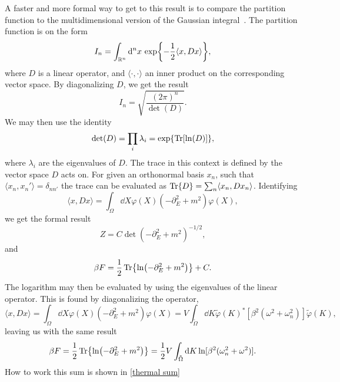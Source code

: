 A faster and more formal way to get to this result is to compare the partition function to the multidimensional version of the Gaussian integral~\cite{Kapusta:finiteTemp, Peskin:IntroQFT}.
The partition function is on the form 
\begin{equation*}
    I_n = \int_{\mathbb{R}^n} \dd^n x\, \exp{- \frac{1}{2} \langle x, D x\rangle },
\end{equation*}
where $D$ is a linear operator, and $\langle \cdot , \cdot \rangle$ an inner product on the corresponding vector space.
By diagonalizing $D$, we get the result
\begin{equation*}
    I_n = \sqrt{\frac{(2 \pi)^n}{\det(D)}}.
\end{equation*}
We may then use the identity
\begin{equation}
    \det(D) = \prod_i \lambda_i = \exp{\Tr[\ln(D)]},
\end{equation}
where $\lambda_i$ are the eigenvalues of $D$.
The trace in this context is defined by the vector space $D$ acts on.
For given an orthonormal basis $x_n$, such that $\langle x_n, x_n'\rangle = \delta_{nn'}$ the trace can be evaluated as $\Tr{D} = \sum_n \langle x_n, D x_n \rangle$.
Identifying 
\begin{equation*}
    \langle x, D x\rangle = \int_\Omega \dd X \varphi(X)\left(-\partial_E^2+m^2\right)\varphi(X),
\end{equation*}
we get the formal result
\begin{equation*}
    Z = C\det(-\partial_E^2 + m^2)^{-1/2},
\end{equation*}
and 
\begin{equation*}
    \beta F = \frac{1}{2}\Tr{\ln(-\partial_E^2 + m^2)} + C.
\end{equation*}
The logarithm may then be evaluated by using the eigenvalues of the linear operator.
This is found by diagonalizing the operator,
\begin{equation*}
    \langle x, D x \rangle 
    = \int_\Omega \dd X \varphi(X)\left(-\partial_E^2+m^2\right)\varphi(X)
    = V  \int_{\tilde \Omega} \dd K 
    \tilde \varphi(K)^* [\beta^2(\omega^2 +\omega_n^2)] \tilde \varphi(K),
\end{equation*}
leaving us with the same result
\begin{equation*}
    \beta F 
    = \frac{1}{2} \Tr{\ln(-\partial_E^2 + m^2)} 
    = \frac{1}{2} V \int_{\tilde \Omega} \dd K \ln[\beta^2(\omega_n^2 + \omega^2)].
\end{equation*}
How to work this sum is shown in \autoref{thermal sum}
